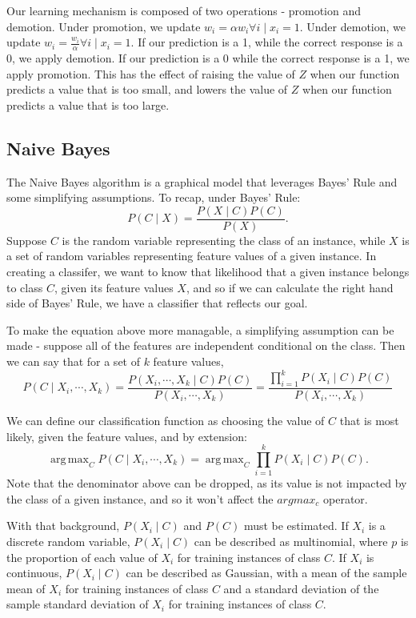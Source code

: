 \documentclass{amsart}
\DeclareMathOperator*{\argmax}{arg\,max}
\begin{document}
    Our learning mechanism is composed of two operations - promotion and demotion.
    Under promotion, we update $w_i = \alpha w_i \forall i \mid x_i = 1$. Under demotion,
    we update $w_i =  \frac{w_i}{\alpha} \forall i \mid x_i = 1$. If our prediction is a 1, while
    the correct response is a 0, we apply demotion. If our prediction is a 0 while the correct
    response is a 1, we apply promotion. This has the effect of raising the value of $Z$ when our
    function predicts a value that is too small, and lowers the value of $Z$ when our
    function predicts a value that is too large.


    \subsection*{Naive Bayes}
    The Naive Bayes algorithm is a graphical model that leverages Bayes' Rule and some simplifying
    assumptions. To recap, under Bayes' Rule:
    \[
        P(C \mid X) = \frac{P(X \mid C) P(C)}{P(X)}.
    \]
    Suppose $C $ is the random variable representing the class of an instance, while $X$ is a
    set of random variables representing feature values of a given instance. In creating a classifer,
    we want to know that likelihood that a given instance belongs to class $C$, given its feature values $X$,
    and so if we can calculate the right hand side of Bayes' Rule, we have a classifier that reflects our goal.

    To make the equation above more managable, a simplifying assumption can be made - suppose all
    of the features are independent conditional on the class. Then we can say that for a set
    of $k$ feature values,
    \[
        P(C \mid X_i, \cdots, X_k ) = \frac{
            P(X_i, \cdots, X_k\mid C) P(C)
        }{P(X_i, \cdots, X_k)}
        = \frac{
            \prod_{i=1}^k P(X_i \mid C) P(C)
        }{P(X_i, \cdots, X_k)}
    \]

    We can define our classification function as choosing the value of $C$ that is most likely, given
    the feature values, and by extension:
    \[
        \argmax_C P(C \mid X_i, \cdots, X_k) = \argmax_C \prod_{i=1}^k P(X_i \mid C) P(C).
    \]
    Note that the denominator above can be dropped, as its value is not impacted by the class
    of a given instance, and so it won't affect the $argmax_c$ operator.

    With that background, $P(X_i \mid C)$ and $P(C)$ must be estimated.
    If $X_i$ is a discrete random variable, $P(X_i \mid C)$ can be described as multinomial,
    where $p$ is the proportion of each value of $X_i$ for training instances of class $C$.
    If $X_i$ is continuous, $P(X_i \mid C)$ can be described as Gaussian, with a mean of the sample
    mean of $X_i$ for training instances of class $C$ and a standard deviation of the sample
    standard deviation of $X_i$ for training instances of class $C$.
\end{document}
